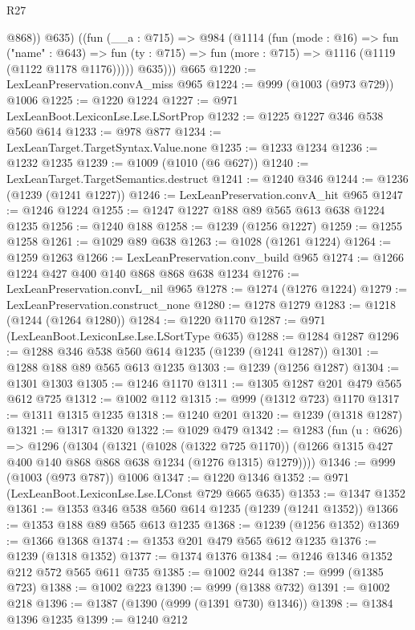 \begin{lexlean}{R27}
\begin{coremodule}
            @868))
          @635)
        ((fun (__a : @715) =>
        @984
          (@1114
            (fun (mode : @16) =>
            fun ("name" : @643) =>
            fun (ty : @715) => fun (more : @715) => @1116 (@1119 (@1122 @1178 @1176)))))
          @635)))
    @665
@1220 := LexLeanPreservation.convA_miss @965
@1224 := @999 (@1003 (@973 @729)) @1006
@1225 := @1220 @1224
@1227 := @971 LexLeanBoot.LexiconLse.Lse.LSortProp
@1232 := @1225 @1227 @346 @538 @560 @614
@1233 := @978 @877
@1234 := LexLeanTarget.TargetSyntax.Value.none
@1235 := @1233 @1234
@1236 := @1232 @1235
@1239 := @1009 (@1010 (@6 @627))
@1240 := LexLeanTarget.TargetSemantics.destruct
@1241 := @1240 @346
@1244 := @1236 (@1239 (@1241 @1227))
@1246 := LexLeanPreservation.convA_hit @965
@1247 := @1246 @1224
@1255 := @1247 @1227 @188 @89 @565 @613 @638 @1224 @1235
@1256 := @1240 @188
@1258 := @1239 (@1256 @1227)
@1259 := @1255 @1258
@1261 := @1029 @89 @638
@1263 := @1028 (@1261 @1224)
@1264 := @1259 @1263
@1266 := LexLeanPreservation.conv_build @965
@1274 := @1266 @1224 @427 @400 @140 @868 @868 @638 @1234
@1276 := LexLeanPreservation.convL_nil @965
@1278 := @1274 (@1276 @1224)
@1279 := LexLeanPreservation.construct_none
@1280 := @1278 @1279
@1283 := @1218 (@1244 (@1264 @1280))
@1284 := @1220 @1170
@1287 := @971 (LexLeanBoot.LexiconLse.Lse.LSortType @635)
@1288 := @1284 @1287
@1296 := @1288 @346 @538 @560 @614 @1235 (@1239 (@1241 @1287))
@1301 := @1288 @188 @89 @565 @613 @1235
@1303 := @1239 (@1256 @1287)
@1304 := @1301 @1303
@1305 := @1246 @1170
@1311 := @1305 @1287 @201 @479 @565 @612 @725
@1312 := @1002 @112
@1315 := @999 (@1312 @723) @1170
@1317 := @1311 @1315 @1235
@1318 := @1240 @201
@1320 := @1239 (@1318 @1287)
@1321 := @1317 @1320
@1322 := @1029 @479
@1342 := @1283
    (fun (u : @626) =>
    @1296
      (@1304
        (@1321
          (@1028 (@1322 @725 @1170))
          (@1266 @1315 @427 @400 @140 @868 @868 @638 @1234 (@1276 @1315) @1279))))
@1346 := @999 (@1003 (@973 @787)) @1006
@1347 := @1220 @1346
@1352 := @971 (LexLeanBoot.LexiconLse.Lse.LConst @729 @665 @635)
@1353 := @1347 @1352
@1361 := @1353 @346 @538 @560 @614 @1235 (@1239 (@1241 @1352))
@1366 := @1353 @188 @89 @565 @613 @1235
@1368 := @1239 (@1256 @1352)
@1369 := @1366 @1368
@1374 := @1353 @201 @479 @565 @612 @1235
@1376 := @1239 (@1318 @1352)
@1377 := @1374 @1376
@1384 := @1246 @1346 @1352 @212 @572 @565 @611 @735
@1385 := @1002 @244
@1387 := @999 (@1385 @723)
@1388 := @1002 @223
@1390 := @999 (@1388 @732)
@1391 := @1002 @218
@1396 := @1387 (@1390 (@999 (@1391 @730) @1346))
@1398 := @1384 @1396 @1235
@1399 := @1240 @212

\end{coremodule}
\end{lexlean}

